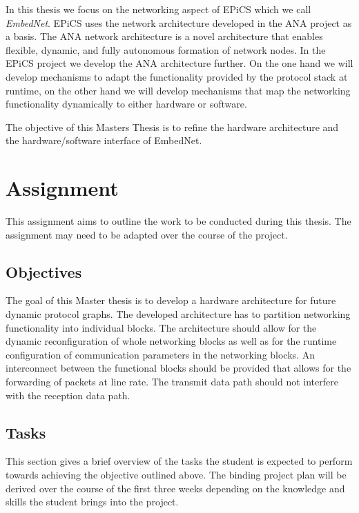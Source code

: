In this thesis we focus on the networking aspect of EPiCS which we call \textit{EmbedNet}. EPiCS uses the network architecture developed in the ANA project as a basis. 
The ANA network architecture is a novel architecture that enables flexible, dynamic, and fully autonomous formation of network nodes.
In the EPiCS project we develop the ANA architecture further. On the one hand we will develop mechanisms to adapt the functionality provided by the protocol stack at runtime, on the other hand we will develop mechanisms that map the networking functionality dynamically to either hardware or software.

The objective of this Masters Thesis is to refine the hardware architecture and the hardware/software interface of EmbedNet. 


\section{Assignment}
This assignment aims to outline the work to be conducted during this thesis. 
The assignment may need to be adapted over the course of the project. 

\subsection{Objectives}
The goal of this Master thesis is to develop a hardware architecture for future dynamic protocol graphs. 
The developed architecture has to partition networking functionality into individual blocks. 
The architecture should allow for the dynamic reconfiguration of whole networking blocks as well as for the runtime configuration of communication parameters in the networking blocks.
An interconnect between the functional blocks should be provided that allows for the forwarding of packets at line rate. The transmit data path should not interfere with the reception data path.

\subsection{Tasks}
This section gives a brief overview of the tasks the student is expected to perform towards achieving the objective outlined above. 
The binding project plan will be derived over the course of the first three weeks depending on the knowledge and skills the student brings into the project.

